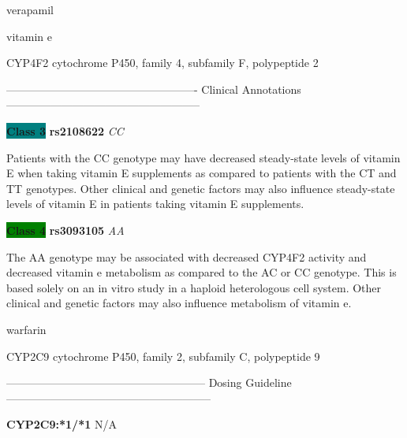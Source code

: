 \documentclass{resume} %
\begin{document}
\begin{rSection}{ verapamil }
\end{rSection}\begin{rSection}{ vitamin e }
\item[]

\begin{rSubsection}{ CYP4F2 }{ cytochrome P450, family 4, subfamily F, polypeptide 2 }{}{}
\item[]

\item[] ---------------------------------------------------- Clinical Annotations -----------------------------------------------------\newline
\item \textbf{\colorbox{teal} {Class 3}} \textbf{ rs2108622 } \textit{ CC }
\item[] Patients with the CC genotype may have decreased steady-state levels of vitamin E when taking vitamin E supplements as compared to patients with the CT and TT genotypes. Other clinical and genetic factors may also influence steady-state levels of vitamin E in patients taking vitamin E supplements.\item \textbf{\colorbox{green} {Class 4}} \textbf{ rs3093105 } \textit{ AA }
\item[] The AA genotype may be associated with decreased CYP4F2 activity and decreased vitamin e metabolism as compared to the AC or CC genotype. This is based solely on an in vitro study in a haploid heterologous cell system. Other clinical and genetic factors may also influence metabolism of vitamin e.
\end{rSubsection}

\end{rSection}\begin{rSection}{ warfarin }
\item[]

\begin{rSubsection}{ CYP2C9 }{ cytochrome P450, family 2, subfamily C, polypeptide 9 }{}{}
\item[]
\item[] ------------------------------------------------------ Dosing Guideline --------------------------------------------------------\newline
\item[]
\item[] \textbf{ CYP2C9:*1/*1 } N/A


\end{rSubsection}
\end{rSection}
\end{document}
